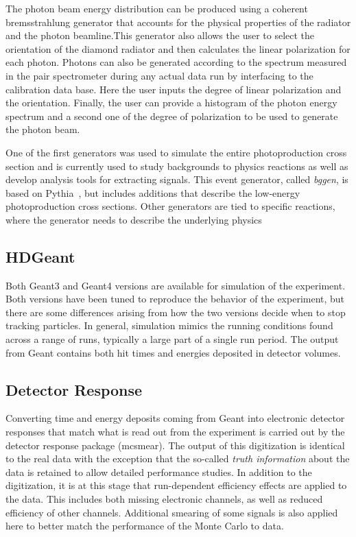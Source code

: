 The photon beam energy distribution can be produced using a coherent bremsstrahlung generator that accounts for the physical properties of the radiator and the photon beamline.This generator also allows the user to select the orientation of the diamond radiator and then calculates the linear polarization for each photon. Photons can also be generated according to the spectrum measured in the pair spectrometer during any actual data run by interfacing to the calibration data base. Here the user inputs the degree of linear polarization and the orientation. Finally, the user can provide a histogram of the photon energy spectrum and a second one of the degree of polarization to be used to generate the photon beam. 

One of the first generators was used to simulate the entire photoproduction cross section and is currently used to study backgrounds to physics reactions as well as develop analysis tools for extracting signals. This event generator, called {\em bggen}, is based on Pythia~\cite{Sjostrand:2006za}, but includes additions that describe the low-energy photoproduction cross sections. Other generators are tied to specific reactions, where the generator needs to describe the underlying physics

\subsection{HDGeant \label{sec:hdgeant}}
Both Geant3 and Geant4 versions are available for simulation of the experiment. Both versions have been tuned to reproduce the behavior of the experiment, but there are some differences arising from how the two versions decide when to stop tracking particles. In general, simulation mimics the running conditions found across a range of runs, typically a large part of a single run period. The output from Geant contains both hit times and energies deposited in detector volumes. 

\subsection[Detector response]{Detector Response}
Converting time and energy deposits coming from Geant into electronic detector responses that match what is read out from the experiment is carried out by the detector response package (mcsmear). The output of this digitization is identical to the real data with the exception that the so-called \emph{truth information} about the data is retained to allow detailed performance studies. In addition to the digitization, it is at this stage that run-dependent efficiency effects are applied to the data. This includes both missing electronic channels, as well as reduced efficiency of other channels. Additional smearing of some signals is also applied here to better match the performance of the Monte Carlo to data. 

